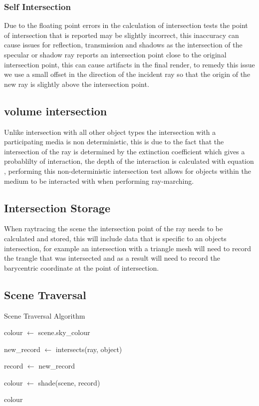 \subsubsection{Self Intersection}
Due to the floating point errors in the calculation of intersection tests the point of intersection that is reported may be
slightly incorrect, this inaccuracy can cause issues for reflection, transmission and shadows as the intersection of the
specular or shadow ray reports an intersection point close to the original intersection point, this can cause artifacts in
the final render, to remedy this issue we use a small offset in the direction of the incident ray so that the origin of the
new ray is slightly above the intersection point.

\subsection{volume intersection}
Unlike intersection with all other object types the intersection with a participating media is non deterministic, this is
due to the fact that the intersection of the ray is determined by the extinction coefficient which gives a probablilty
of interaction, the depth of the interaction is calculated with equation , performing this non-deterministic
intersection test allows for objects within the medium to be interacted with when performing ray-marching.


\subsection{Intersection Storage}
When raytracing the scene the intersection point of the ray needs to be calculated and stored, this will include data that
is specific to an objects intersection, for example an intersection with a triangle mesh will need to record the trangle
that was intersected and as a result will need to record the barycentric coordinate at the point of intersection.

\subsection{Scene Traversal}
\begin{algorithm}
\begin{algorithmic}
\caption{Scene Traversal Algorithm}
\State colour $\gets$ scene.sky\_colour

	new\_record $\gets$ intersects(ray, object)


	record $\gets$ new\_record

	\EndIf

\EndFor


	colour $\gets$ shade(scene, record)
\EndIf

\Return colour

\end{algorithmic}
\end{algorithm}

\newpage

\newpage

